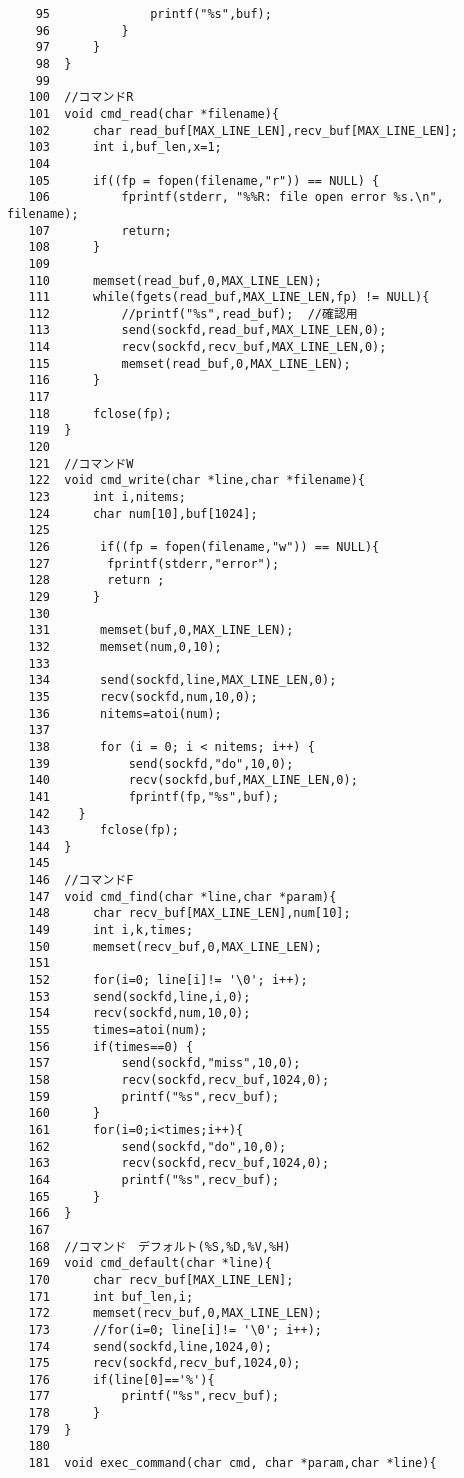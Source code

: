 \documentclass{jarticle}[11pt]
\begin{document}
\begin{verbatim}
    95	            printf("%s",buf);
    96	        }
    97	    }
    98	}
    99	
   100	//コマンドR
   101	void cmd_read(char *filename){
   102	    char read_buf[MAX_LINE_LEN],recv_buf[MAX_LINE_LEN];
   103	    int i,buf_len,x=1;
   104	
   105	    if((fp = fopen(filename,"r")) == NULL) {
   106	        fprintf(stderr, "%%R: file open error %s.\n", filename);
   107	        return;
   108	    }
   109	
   110	    memset(read_buf,0,MAX_LINE_LEN);
   111	    while(fgets(read_buf,MAX_LINE_LEN,fp) != NULL){
   112	        //printf("%s",read_buf);  //確認用
   113	        send(sockfd,read_buf,MAX_LINE_LEN,0);
   114	        recv(sockfd,recv_buf,MAX_LINE_LEN,0);
   115	        memset(read_buf,0,MAX_LINE_LEN);
   116	    }
   117	   
   118	    fclose(fp);
   119	}
   120	
   121	//コマンドW
   122	void cmd_write(char *line,char *filename){
   123	    int i,nitems;
   124	    char num[10],buf[1024];
   125	
   126	     if((fp = fopen(filename,"w")) == NULL){
   127	      fprintf(stderr,"error");
   128	      return ;
   129	    }
   130	
   131	     memset(buf,0,MAX_LINE_LEN);
   132	     memset(num,0,10);
   133	
   134	     send(sockfd,line,MAX_LINE_LEN,0);
   135	     recv(sockfd,num,10,0);
   136	     nitems=atoi(num);
   137	
   138	     for (i = 0; i < nitems; i++) {
   139	         send(sockfd,"do",10,0);
   140	         recv(sockfd,buf,MAX_LINE_LEN,0);
   141	         fprintf(fp,"%s",buf);
   142	  }
   143	     fclose(fp);
   144	}
   145	
   146	//コマンドF
   147	void cmd_find(char *line,char *param){
   148	    char recv_buf[MAX_LINE_LEN],num[10];
   149	    int i,k,times;
   150	    memset(recv_buf,0,MAX_LINE_LEN);
   151	
   152	    for(i=0; line[i]!= '\0'; i++);
   153	    send(sockfd,line,i,0);
   154	    recv(sockfd,num,10,0);
   155	    times=atoi(num);
   156	    if(times==0) {
   157	        send(sockfd,"miss",10,0);
   158	        recv(sockfd,recv_buf,1024,0);
   159	        printf("%s",recv_buf);
   160	    }
   161	    for(i=0;i<times;i++){
   162	        send(sockfd,"do",10,0);
   163	        recv(sockfd,recv_buf,1024,0);
   164	        printf("%s",recv_buf);
   165	    }
   166	}
   167	
   168	//コマンド　デフォルト(%S,%D,%V,%H)
   169	void cmd_default(char *line){
   170	    char recv_buf[MAX_LINE_LEN];
   171	    int buf_len,i;
   172	    memset(recv_buf,0,MAX_LINE_LEN);
   173	    //for(i=0; line[i]!= '\0'; i++);
   174	    send(sockfd,line,1024,0);
   175	    recv(sockfd,recv_buf,1024,0);
   176	    if(line[0]=='%'){
   177	        printf("%s",recv_buf);
   178	    }
   179	}
   180	
   181	void exec_command(char cmd, char *param,char *line){

\end{verbatim}
\end{document}
